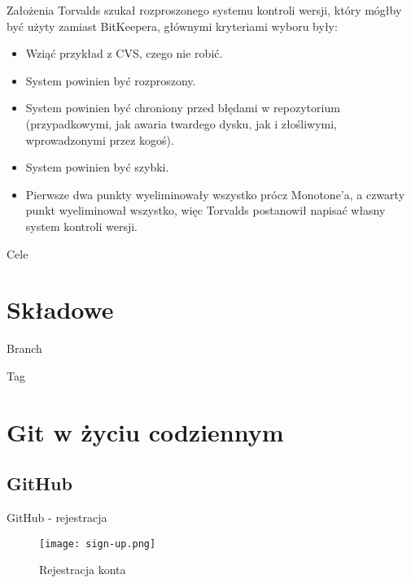 \documentclass{beamer}
\begin{document}
\begin{frame}{Założenia}
Torvalds szukał rozproszonego systemu kontroli wersji, który mógłby być użyty zamiast BitKeepera, głównymi kryteriami wyboru były:
\begin{itemize}
	\item Wziąć przykład z CVS, czego nie robić.
	\item System powinien być rozproszony.
	\item System powinien być chroniony przed błędami w repozytorium (przypadkowymi, jak awaria twardego dysku, jak i złośliwymi, wprowadzonymi przez kogoś).
	\item System powinien być szybki.
	\item Pierwsze dwa punkty wyeliminowały wszystko prócz Monotone'a, a czwarty punkt wyeliminował wszystko, więc Torvalds postanowił napisać własny system kontroli wersji.
\end{itemize}
\end{frame}

\begin{frame}{Cele}
\end{frame}


\section{Składowe}

\begin{frame}{Branch}
\end{frame}

\begin{frame}{Tag}
\end{frame}


\section{Git w życiu codziennym}

\subsection{GitHub}

\begin{frame}{GitHub - rejestracja}
	\begin{figure}
	\texttt{[image: sign-up.png]}
	\caption{\label{fig:sign-up}Rejestracja konta}
	\end{figure}
\end{frame}
\end{document}
